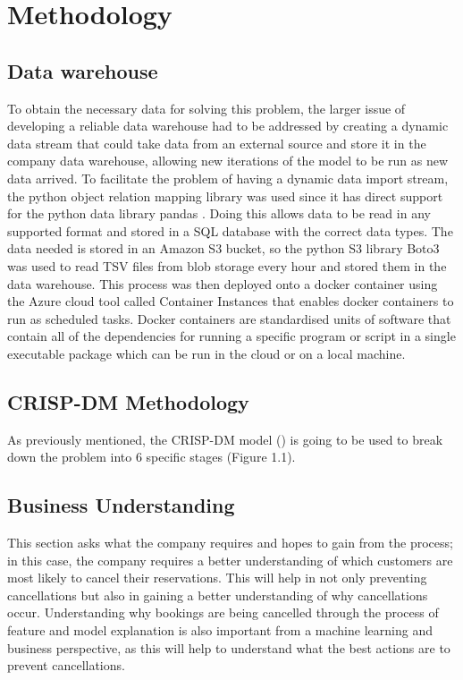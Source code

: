 \chapter{Methodology}
\label{ch:method}

\section{Data warehouse}
To obtain the necessary data for solving this problem, the larger issue of developing a reliable data warehouse had to be addressed by creating a dynamic data stream that could take data from an external source and store it in the company data warehouse, allowing new iterations of the model to be run as new data arrived. To facilitate the problem of having a dynamic data import stream, the python object relation mapping library was used since it has direct support for the python data library pandas . Doing this allows data to be read in any supported format and stored in a SQL database with the correct data types. The data needed is stored in an Amazon S3 bucket, so the python S3 library Boto3 was used to read TSV files from blob storage every hour and stored them in the data warehouse. This process was then deployed onto a docker container using the Azure cloud tool called Container Instances that enables docker containers to run as scheduled tasks. Docker containers are standardised units of software that contain all of the dependencies for running a specific program or script in a single executable package which can be run in the cloud or on a local machine.

\section{CRISP-DM Methodology}

As previously mentioned, the CRISP-DM model (\cite{Wirth2000CRISP-DMMining}) is going to be used to break down the problem into 6 specific stages (Figure 1.1). 

\section{Business Understanding}

This section asks what the company requires and hopes to gain from the process; in this case, the company requires a better understanding of which customers are most likely to cancel their reservations. This will help in not only preventing cancellations but also in gaining a better understanding of why cancellations occur. Understanding why bookings are being cancelled through the process of feature and model explanation is also important from a machine learning and business perspective, as this will help to understand what the best actions are to prevent cancellations.

